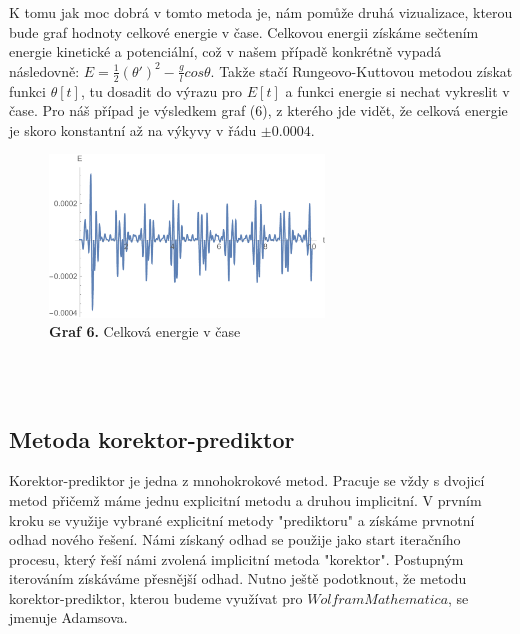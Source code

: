 \documentclass[reqno, a4paper]{amsart}
\begin{document}
				K tomu jak moc dobrá v tomto metoda je, nám pomůže druhá vizualizace, kterou bude graf hodnoty celkové energie v čase. Celkovou energii získáme sečtením energie kinetické a potenciální, což v našem případě konkrétně vypadá následovně: $E = \frac{1}{2} (\theta')^2 - \frac{g}{l} cos \theta$. Takže stačí Rungeovo-Kuttovou metodou získat funkci $\theta[t]$, tu dosadit do výrazu pro $E[t]$ a funkci energie si nechat vykreslit v čase. Pro náš případ je výsledkem graf (6), z kterého jde vidět, že celková energie je skoro konstantní až na výkyvy v řádu $\pm 0.0004$.
				\begin{figure}[h]
					\begin{flushleft}
						\includegraphics[width=0.65\textwidth]{Runge - Kutta, Energie}
						\caption*{\textbf{Graf 6.} Celková energie v čase}
					\end{flushleft}
				\end{figure}\\
			\\
				\subsection{Metoda korektor-prediktor}
				\label{sec:Metoda korektor-prediktor}
				Korektor-prediktor je jedna z mnohokrokové metod. Pracuje se vždy s dvojicí metod přičemž máme jednu explicitní metodu a druhou implicitní. V prvním kroku se využije vybrané explicitní metody "prediktoru" a získáme prvnotní odhad nového řešení. Námi získaný odhad se použije jako start iteračního procesu, který řeší námi zvolená implicitní metoda "korektor". Postupným iterováním získáváme přesnější odhad. Nutno ještě podotknout, že metodu korektor-prediktor, kterou budeme využívat pro $ Wolfram Mathematica $, se jmenuje Adamsova.
\end{document}
